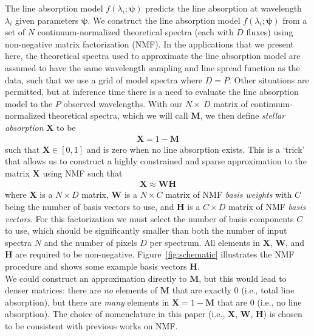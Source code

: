 \documentclass[modern]{aastex631}
\renewcommand{\vec}[1]{\mathbf{#1}}
\newcommand{\vecpsi}{\boldsymbol{\psi}}
\newcommand{\vecW}{\mathbf{W}}
\newcommand{\vecH}{\mathbf{H}}
\newcommand{\vecX}{\mathbf{X}}
\begin{document}
The line absorption model $f(\lambda_i;\vecpsi)$ predicts the line absorption at wavelength $\lambda_i$ given parameters $\vecpsi$. We construct the line absorption model $f(\lambda_i;\vecpsi)$ from a set of $N$ continuum-normalized theoretical spectra (each with $D$ fluxes) using non-negative matrix factorization (NMF). In the applications that we present here, the theoretical spectra used to approximate the line absorption model are assumed to have the same wavelength sampling and line spread function as the data, such that we use a grid of model spectra where $D = P$. Other situations are permitted, but at inference time there is a need to evaluate the line absorption model to the $P$ observed wavelengths. With our $N \times\ D$ matrix of continuum-normalized theoretical spectra, which we will call $\vec{M}$, we then define \emph{stellar absorption} $\vecX$ to be
\begin{align}
    \vecX = 1 - \vec{M}
\end{align}
such that $\vecX \in \left[0, 1\right]$ and is zero when no line absorption exists. This is a `trick' that allows us to construct a highly constrained and sparse approximation to the matrix $\vecX$ using NMF such that 
\begin{align}
    \vecX \approx \vec{W}\vec{H} \label{eq:nmf}
\end{align}
where $\vecX$ is a $N \times D$ matrix, $\vecW$ is a $N \times C$ matrix of NMF \emph{basis weights} with $C$ being the number of basis vectors to use, and $\vecH$ is a $C \times D$ matrix of NMF \emph{basis vectors}. For this factorization we must select the number of basis components $C$ to use, which should be significantly smaller than both the number of input spectra $N$ and the number of pixels $D$ per spectrum. All elements in $\vecX$, $\vec{W}$, and $\vec{H}$ are required to be non-negative. Figure~\ref{fig:schematic} illustrates the NMF procedure and shows some example basis vectors $\vec{H}$.\\

We could construct an approximation directly to $\vec{M}$, but this would lead to denser matrices: there are \emph{no} elements of $\vec{M}$ that are exactly 0 (i.e., total line absorption), but there are \emph{many} elements in $\vecX = 1 - \vec{M}$ that are 0 (i.e., no line absorption). The choice of nomenclature in this paper (i.e., $\vecX$, $\vec{W}$, $\vec{H}$) is chosen to be consistent with previous works on NMF.\\

\end{document}
